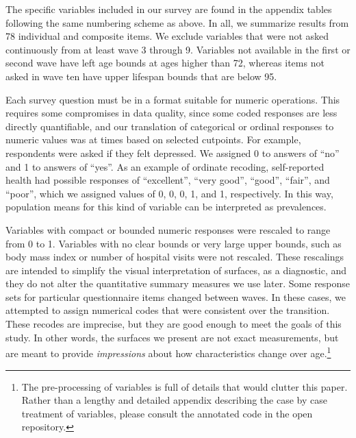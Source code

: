 \documentclass[11pt,oneside]{article} %
\begin{document}
The specific variables included in our survey are found in the appendix
tables following the same numbering scheme as above. In all, we summarize
results from 78 individual and composite items.
We exclude variables that were not asked continuously from at least wave 3 through 9. Variables not available in the
first or second wave have left age bounds at ages higher than 72, whereas items
not asked in wave ten have upper lifespan bounds that are below 95.

Each survey question must be in a format suitable for numeric operations.
This requires some compromises in data quality, since some coded responses are less directly
quantifiable, and our translation of categorical or ordinal responses to numeric
values was at times based on selected cutpoints. For example, respondents were
asked if they felt depressed. We assigned 0 to answers of ``no'' and 1 to answers of ``yes''.
As an example of ordinate recoding, self-reported health had possible responses
of ``excellent'', ``very good'', ``good'', ``fair'', and ``poor'', which we
assigned values of 0, 0, 0, 1, and 1, respectively. In this way, population
means for this kind of variable can be interpreted as prevalences.

Variables with compact or bounded numeric responses were rescaled to range from
0 to 1. Variables with no clear bounds or very large upper
bounds, such as body mass index or number of hospital
visits were not rescaled. These rescalings are intended to simplify
the visual interpretation of surfaces, as a diagnostic, and they do not alter
the quantitative summary measures we use later. Some response sets for particular questionnaire items changed between waves. In
these cases, we attempted to assign numerical codes that were consistent over the transition. These recodes are imprecise, but they are good enough to meet the goals of this study. In other words, the surfaces we present are not exact measurements, but are meant to provide
\textit{impressions} about how characteristics change over age.\footnote{The
pre-processing of variables is full of details that would clutter this paper.
Rather than a lengthy and detailed appendix describing the case by case
treatment of variables, please consult the annotated code in the open
repository.}

\end{document}
